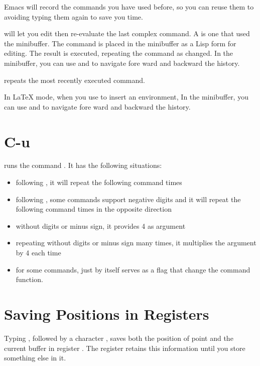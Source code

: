 Emacs will record the commands you have used before, so you can reuse them to avoiding typing them again to save you time.


 will let you edit then re-evaluate the last complex command.
A  is one that used the minibuffer.
The command is placed in the minibuffer as a Lisp form for editing.
The result is executed, repeating the command as changed.
In the minibuffer, you can use  and  to navigate fore ward and backward the history.


 repeats the most recently executed command.


In LaTeX mode, when you use  to insert an environment, 
In the minibuffer, you can use  and  to navigate fore ward and backward the history.


\section{C-u}
\label{sec:c-u}

 runs the command .
It has the following situations:
\begin{itemize}
\item following , it will repeat the following command  times
\item following , some commands support negative digits and it will repeat the following command  times in the opposite direction
\item without digits or minus sign, it provides 4 as argument
\item repeating  without digits or minus sign many times, it multiplies the argument by 4 each time
\item for some commands, just  by itself serves as a flag that change the command function.
\end{itemize}



\section{Saving Positions in Registers}
\label{sec:saving-posit-regist}

Typing , followed by a character , saves both the position of point and the current buffer in register .
The register retains this information until you store something else in it.


